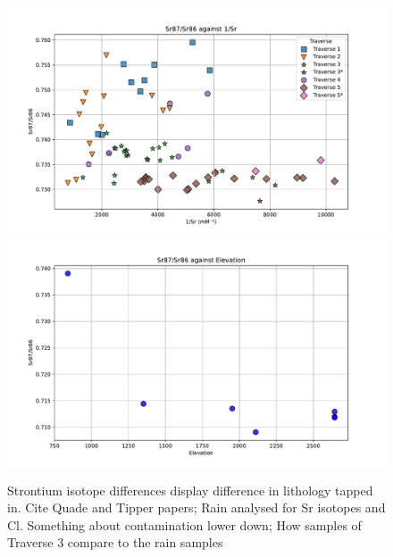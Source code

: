 \begin{figure}[p]
    \centering
    \includegraphics[width=\textwidth]{Sr87_Sr86_1_Sr.pdf}
    \includegraphics[width=\textwidth]{Sr87_Sr86_Elevation.pdf}
    \caption{Strontium isotope differences display difference in lithology tapped in. Cite Quade and Tipper papers; Rain analysed for Sr isotopes and Cl. Something about contamination lower down; How samples of Traverse 3 compare to the rain samples}
    \label{fig:discussion3}
\end{figure}

